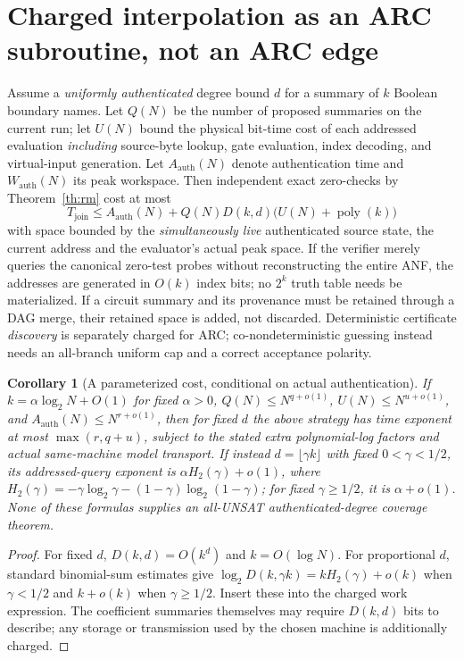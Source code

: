 \documentclass[11pt]{article}
\newtheorem{corollary}[theorem]{Corollary}
\begin{document}
\section{Charged interpolation as an ARC subroutine, not an ARC edge}\label{sec:charge}
Assume a \emph{uniformly authenticated} degree bound $d$ for a summary of $k$ Boolean boundary names. Let $Q(N)$ be the number of proposed summaries on the current run; let $U(N)$ bound the physical bit-time cost of each addressed evaluation \emph{including} source-byte lookup, gate evaluation, index decoding, and virtual-input generation. Let $A_{\mathrm{auth}}(N)$ denote authentication time and $W_{\mathrm{auth}}(N)$ its peak workspace. Then independent exact zero-checks by Theorem~\ref{th:rm} cost at most
\[
 T_{\mathrm{join}}\le A_{\mathrm{auth}}(N)+Q(N)D(k,d)\bigl(U(N)+\operatorname{poly}(k)\bigr)
\]
with space bounded by the \emph{simultaneously live} authenticated source state, the current address and the evaluator's actual peak space. If the verifier merely queries the canonical zero-test probes without reconstructing the entire ANF, the addresses are generated in $O(k)$ index bits; no $2^k$ truth table needs be materialized. If a circuit summary and its provenance must be retained through a DAG merge, their retained space is added, not discarded. Deterministic certificate \emph{discovery} is separately charged for ARC; co-nondeterministic guessing instead needs an all-branch uniform cap and a correct acceptance polarity.
\begin{corollary}[A parameterized cost, conditional on actual authentication]\label{cor:cost}
If $k=\alpha\log_2N+O(1)$ for fixed $\alpha>0$, $Q(N)\le N^{q+o(1)}$, $U(N)\le N^{u+o(1)}$, and $A_{\mathrm{auth}}(N)\le N^{r+o(1)}$, then for fixed $d$ the above strategy has time exponent at most $\max(r,q+u)$, subject to the stated extra polynomial-log factors and actual same-machine model transport. If instead $d=\lfloor\gamma k\rfloor$ with fixed $0<\gamma<1/2$, its addressed-query exponent is $\alpha H_2(\gamma)+o(1)$, where $H_2(\gamma)=-\gamma\log_2\gamma-(1-\gamma)\log_2(1-\gamma)$; for fixed $\gamma\ge1/2$, it is $\alpha+o(1)$. None of these formulas supplies an all-UNSAT authenticated-degree coverage theorem.
\end{corollary}
\begin{proof}
For fixed $d$, $D(k,d)=O(k^d)$ and $k=O(\log N)$. For proportional $d$, standard binomial-sum estimates give $\log_2D(k,\gamma k)=kH_2(\gamma)+o(k)$ when $\gamma<1/2$ and $k+o(k)$ when $\gamma\ge1/2$. Insert these into the charged work expression. The coefficient summaries themselves may require $D(k,d)$ bits to describe; any storage or transmission used by the chosen machine is additionally charged.
\end{proof}
\end{document}
